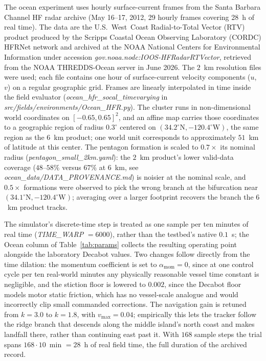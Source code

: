 \documentclass[lettersize,journal]{IEEEtran}
\begin{document}
The ocean experiment uses hourly surface-current frames from the
Santa Barbara Channel HF radar archive (May 16--17, 2012, 29 hourly
frames covering 28~h of real time). The data are the U.S.~West~Coast
Radial-to-Total Vector (RTV) product produced by the Scripps Coastal
Ocean Observing Laboratory (CORDC) HFRNet network and archived at the
NOAA National Centers for Environmental Information under accession
\textit{gov.noaa.nodc:IOOS-HFRadarRTVector}, retrieved from the NOAA
THREDDS-Ocean server in June 2026. The $2$~km resolution files were
used; each file contains one hour of surface-current velocity
components ($u$, $v$) on a regular geographic grid. Frames are
linearly interpolated in time inside the field evaluator
(\textit{ocean\_hfr\_socal\_timevarying} in
\textit{src/fields/environments/Ocean\_HFR.py}). The cluster runs in
non-dimensional world coordinates on $[-0.65, 0.65]^2$, and an affine
map carries those coordinates to a geographic region of radius
$0.3^{\circ}$ centered on $(34.2^{\circ}\mathrm{N},
-120.4^{\circ}\mathrm{W})$, the same region as the $6$~km product; one
world unit corresponds to approximately $51$~km of latitude at this
center. The pentagon formation is scaled to $0.7\times$ its nominal
radius (\textit{pentagon\_small\_2km.yaml}): the $2$~km product's
lower valid-data coverage ($48$--$58\%$ versus $67\%$ at $6$~km, see
\textit{ocean\_data/DATA\_PROVENANCE.md}) is noisier at the nominal
scale, and $0.5\times$ formations were observed to pick the wrong
branch at the bifurcation near $(34.1^{\circ}\mathrm{N},
-120.4^{\circ}\mathrm{W})$; averaging over a larger footprint recovers
the branch the $6$~km product tracks.

The simulator's discrete-time step is treated as one sample per ten
minutes of real time (\textit{TIME\_WARP} $= 6000$), rather than the
testbed's native $0.1$~s; the Ocean column of Table~\ref{tab:params}
collects the resulting operating point alongside the laboratory
Decabot values. Two changes follow directly from the time dilation:
the momentum coefficient is set to $\alpha_{\text{mom}} = 0$, since at
one control cycle per ten real-world minutes any physically reasonable
vessel time constant is negligible, and the stiction floor is lowered
to $0.002$, since the Decabot floor models motor static friction,
which has no vessel-scale analogue and would incorrectly clip small
commanded corrections. The navigation gain is retuned from $k = 3.0$
to $k = 1.8$, with $v_{\max} = 0.04$; empirically this lets the
tracker follow the ridge branch that descends along the middle
island's north coast and makes landfall there, rather than continuing
east past it. With $168$ sample steps the trial spans $168 \cdot
10$~min $= 28$~h of real field time, the full duration of the archived
record.
\end{document}
